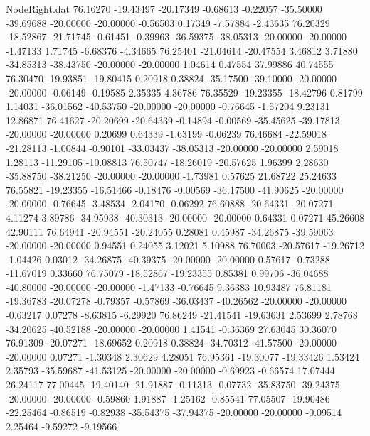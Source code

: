\begin{filecontents}{NodeRight.dat}
  76.16270  -19.43497  -20.17349    -0.68613   -0.22057  -35.50000  -39.69688  -20.00000  -20.00000   -0.56503    0.17349   -7.57884   -2.43635
  76.20329  -18.52867  -21.71745    -0.61451   -0.39963  -36.59375  -38.05313  -20.00000  -20.00000   -1.47133    1.71745   -6.68376   -4.34665
  76.25401  -21.04614  -20.47554     3.46812    3.71880  -34.85313  -38.43750  -20.00000  -20.00000    1.04614    0.47554   37.99886   40.74555
  76.30470  -19.93851  -19.80415     0.20918    0.38824  -35.17500  -39.10000  -20.00000  -20.00000   -0.06149   -0.19585    2.35335    4.36786
  76.35529  -19.23355  -18.42796     0.81799    1.14031  -36.01562  -40.53750  -20.00000  -20.00000   -0.76645   -1.57204    9.23131   12.86871
  76.41627  -20.20699  -20.64339    -0.14894   -0.00569  -35.45625  -39.17813  -20.00000  -20.00000    0.20699    0.64339   -1.63199   -0.06239
  76.46684  -22.59018  -21.28113    -1.00844   -0.90101  -33.03437  -38.05313  -20.00000  -20.00000    2.59018    1.28113  -11.29105  -10.08813
  76.50747  -18.26019  -20.57625     1.96399    2.28630  -35.88750  -38.21250  -20.00000  -20.00000   -1.73981    0.57625   21.68722   25.24633
  76.55821  -19.23355  -16.51466    -0.18476   -0.00569  -36.17500  -41.90625  -20.00000  -20.00000   -0.76645   -3.48534   -2.04170   -0.06292
  76.60888  -20.64331  -20.07271     4.11274    3.89786  -34.95938  -40.30313  -20.00000  -20.00000    0.64331    0.07271   45.26608   42.90111
  76.64941  -20.94551  -20.24055     0.28081    0.45987  -34.26875  -39.59063  -20.00000  -20.00000    0.94551    0.24055    3.12021    5.10988
  76.70003  -20.57617  -19.26712    -1.04426    0.03012  -34.26875  -40.39375  -20.00000  -20.00000    0.57617   -0.73288  -11.67019    0.33660
  76.75079  -18.52867  -19.23355     0.85381    0.99706  -36.04688  -40.80000  -20.00000  -20.00000   -1.47133   -0.76645    9.36383   10.93487
  76.81181  -19.36783  -20.07278    -0.79357   -0.57869  -36.03437  -40.26562  -20.00000  -20.00000   -0.63217    0.07278   -8.63815   -6.29920
  76.86249  -21.41541  -19.63631     2.53699    2.78768  -34.20625  -40.52188  -20.00000  -20.00000    1.41541   -0.36369   27.63045   30.36070
  76.91309  -20.07271  -18.69652     0.20918    0.38824  -34.70312  -41.57500  -20.00000  -20.00000    0.07271   -1.30348    2.30629    4.28051
  76.95361  -19.30077  -19.33426     1.53424    2.35793  -35.59687  -41.53125  -20.00000  -20.00000   -0.69923   -0.66574   17.07444   26.24117
  77.00445  -19.40140  -21.91887    -0.11313   -0.07732  -35.83750  -39.24375  -20.00000  -20.00000   -0.59860    1.91887   -1.25162   -0.85541
  77.05507  -19.90486  -22.25464    -0.86519   -0.82938  -35.54375  -37.94375  -20.00000  -20.00000   -0.09514    2.25464   -9.59272   -9.19566

\end{filecontents}
